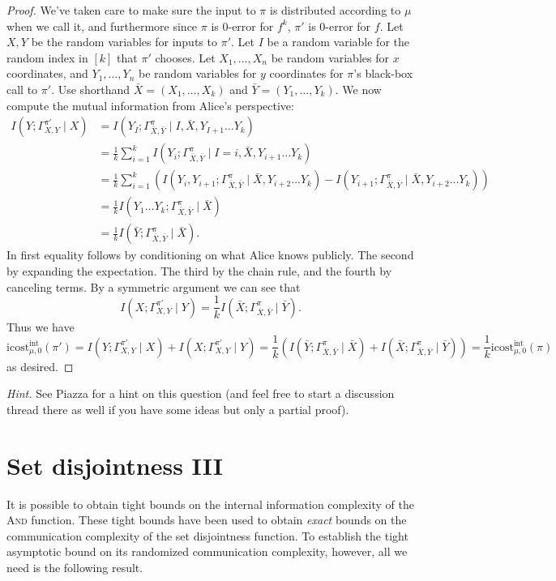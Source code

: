 \documentclass[11pt]{amsart}
\theoremstyle{plain}
\theoremstyle{definition}
\theoremstyle{plain}
\newcommand{\icostint}{\mathrm{icost}^{\mathrm{int}}}
\begin{document}
\begin{proof}
We've taken care to make sure the input to $\pi$ is distributed according to $\mu$ when we call it, and furthermore since $\pi$ is $0$-error for $f^k$, $\pi'$ is $0$-error for $f$. Let $X,Y$ be the random variables for inputs to $\pi'$. Let $I$ be a random variable for the random index in $[k]$ that $\pi'$ chooses. Let $X_1,\dots, X_n$ be random variables for $x$ coordinates, and $Y_1,\dots, Y_n$ be random variables for $y$ coordinates for $\pi$'s black-box call to $\pi'$. Use shorthand $\bar{X} = (X_1,\dots, X_k)$ and $\bar{Y} = (Y_1,\dots, Y_k)$. We now compute the mutual information from Alice's perspective:
\begin{align*}
I(Y;\Gamma^{\pi'}_{X,Y}\mid X) &= I(Y_I;\Gamma^\pi_{\bar{X},\bar{Y}} \mid I, \bar{X}, Y_{I+1} \dots Y_{k}) \\
&= \frac{1}{k}\sum_{i=1}^kI(Y_i; \Gamma^\pi_{\bar{X},\bar{Y}}\mid I=i, \bar{X}, Y_{i+1}\dots Y_{k}) \\
&= \frac{1}{k}\sum_{i=1}^k \left(I(Y_i,Y_{i+1}; \Gamma^\pi_{\bar{X},\bar{Y}}\mid \bar{X}, Y_{i+2}\dots Y_{k}) - I(Y_{i+1}; \Gamma^\pi_{\bar{X},\bar{Y}}\mid \bar{X}, Y_{i+2}\dots Y_k)\right) \\
&= \frac{1}{k}I(Y_1\dots Y_k ; \Gamma^\pi_{\bar{X},\bar{Y}}\mid \bar{X}) \\
&= \frac{1}{k}I(\bar{Y};\Gamma^\pi_{\bar{X},\bar{Y}}\mid \bar{X}).
\end{align*}
In first equality follows by conditioning on what Alice knows publicly. The second by expanding the expectation. The third by the chain rule, and the fourth by canceling terms. By a symmetric argument we can see that
$$I(X;\Gamma^{\pi'}_{X,Y}\mid Y) = \frac{1}{k}I(\bar{X};\Gamma^\pi_{\bar{X},\bar{Y}}\mid \bar{Y}).$$
Thus we have
$$\icostint_{\mu,0}(\pi') = I(Y;\Gamma^{\pi'}_{X,Y}\mid X) + I(X;\Gamma^{\pi'}_{X,Y}\mid Y) = \frac{1}{k}(I(\bar{Y};\Gamma^\pi_{\bar{X},\bar{Y}}\mid \bar{X}) + I(\bar{X};\Gamma^\pi_{\bar{X},\bar{Y}}\mid \bar{Y})) =  \frac{1}{k}\icostint_{\mu,0}(\pi)$$
as desired.
\end{proof}

\bigskip
\noindent \emph{Hint.} See Piazza for a hint on this question (and feel free to start a discussion thread there as well if you have some ideas but only a partial proof).


\newpage 
\section{Set disjointness III}

It is possible to obtain tight bounds on the internal information complexity of the \textsc{And} function. These tight bounds have been used to obtain \emph{exact} bounds on the communication complexity of the set disjointness function. To establish the tight asymptotic bound on its randomized communication complexity, however, all we need is the following result.
\end{document}
